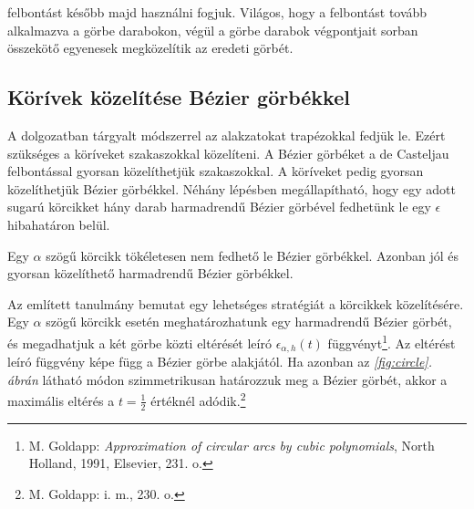 \documentclass[12pt]{report}
\theoremstyle{definition}
\begin{document}
 felbontást később majd használni fogjuk. Világos, hogy a felbontást
tovább alkalmazva a görbe darabokon, végül a görbe darabok végpontjait sorban
összekötő egyenesek megközelítik az eredeti görbét.

    \subsection*{Körívek közelítése Bézier görbékkel}
    \label{sec:arctobezier}

A dolgozatban tárgyalt módszerrel az alakzatokat trapézokkal fedjük le. Ezért
szükséges a köríveket szakaszokkal közelíteni. A Bézier görbéket a de Casteljau
felbontással gyorsan közelíthetjük szakaszokkal. A köríveket pedig gyorsan
közelíthetjük Bézier görbékkel. Néhány lépésben megállapítható, hogy egy adott
sugarú körcikket hány darab harmadrendű Bézier görbével fedhetünk le egy
$\epsilon$ hibahatáron belül.

Egy $\alpha$ szögű körcikk tökéletesen nem fedhető le Bézier
görbékkel\cite[Goldapp]{Goldapp:1991:approximation}. Azonban jól és gyorsan
közelíthető harmadrendű Bézier görbékkel.

Az említett \cite[Goldapp]{Goldapp:1991:approximation} tanulmány bemutat egy
lehetséges stratégiát a körcikkek közelítésére. Egy $\alpha$ szögű körcikk
esetén meghatározhatunk egy harmadrendű Bézier görbét, és megadhatjuk a két
görbe közti eltérését leíró $\epsilon_{\alpha,h}(t)$ függvényt\footnote{M.
Goldapp: \emph{Approximation of circular arcs by cubic polynomials}, North
Holland, 1991, Elsevier, 231. o.}. Az eltérést leíró függvény képe függ a Bézier
görbe alakjától. Ha azonban az \emph{\ref{fig:circle}. ábrán} látható módon
szimmetrikusan határozzuk meg a Bézier görbét, akkor a maximális eltérés a
$t=\frac{1}{2}$ értéknél adódik.\footnote{M. Goldapp: i. m., 230. o.}
\end{document}
